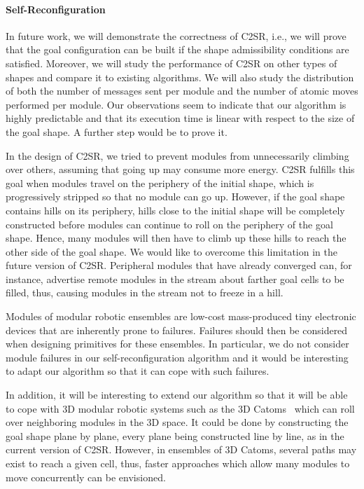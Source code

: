 \paragraph{Self-Reconfiguration} In future work, we will demonstrate the correctness of C2SR, i.e., we will prove that the goal configuration can be built if the shape admissibility conditions are satisfied. Moreover, we will study the performance of C2SR on other types of shapes and compare it to existing algorithms. We will also study the distribution of both the number of messages sent per module and the number of atomic moves performed per module. Our observations seem to indicate that our algorithm is highly predictable and that its execution time is linear with respect to the size of the goal shape. A further step would be to prove it. 

In the design of C2SR, we tried to prevent modules from unnecessarily climbing over others, assuming that going up may consume more energy. C2SR fulfills this goal when modules travel on the periphery of the initial shape, which is progressively stripped so that no module can go up. However, if the goal shape contains hills on its periphery, hills close to the initial shape will be completely constructed before modules can continue to roll on the periphery of the goal shape. Hence, many modules will then have to climb up these hills to reach the other side of the goal shape. We would like to overcome this limitation in the future version of C2SR. Peripheral modules that have already converged can, for instance, advertise remote modules in the stream about farther goal cells to be filled, thus, causing modules in the stream not to freeze in a hill.

Modules of modular robotic ensembles are low-cost mass-produced tiny electronic devices that are inherently prone to failures. Failures should then be considered when designing primitives for these ensembles. In particular, we do not consider module failures in our self-reconfiguration algorithm and it would be interesting to adapt our algorithm so that it can cope with such failures.

In addition, it will be interesting to extend our algorithm so that it will be able to cope with 3D modular robotic systems such as the 3D Catoms~\cite{piranda2016geom} which can roll over neighboring modules in the 3D space. It could be done by constructing the goal shape plane by plane, every plane being constructed line by line, as in the current version of C2SR. However, in ensembles of 3D Catoms, several paths may exist to reach a given cell, thus, faster approaches which allow many modules to move concurrently can be envisioned.

